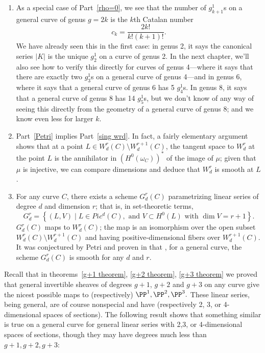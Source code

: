 \begin{remark}
\begin{enumerate}
\item As a special case of Part~\ref{rho=0}, we see that the number of $g^1_{k+1}$s on a general curve of genus $g = 2k$ is the $k$th Catalan number 
$$
c_k = \frac{2k!}{k!(k+1)!}.
$$
We have already seen this in the first case: in genus 2, it says the canonical series $|K|$ is the unique $g^1_2$ on a curve of genus 2. In the next chapter, we'll also see how to verify this directly for curves of genus 4---where it says that there are exactly two $g^1_3$s on a general curve of genus 4---and in genus 6, where it says that a general curve of genus 6 has 5 $g^1_4$s.  In genus 8, it says that a general curve of genus 8 has 14 $g^1_5$s, but we don't know of any way of seeing this directly from the geometry of a general curve of genus 8; and we know even less for larger $k$.

\item Part~\ref{Petri} implies Part~\ref{sing wrd}. In fact, a fairly elementary argument shows that at a point $L \in W^r_d(C) \setminus W^{r+1}_d(C)$, the tangent space to $W^r_d$ at the point $L$ is the annihilator
in $(H^0(\omega_C))^*$ of the image of $\mu$; given that $\mu$ is injective, we can compare dimensions and deduce that $W^r_d$ is smooth at $L$.

\item For any curve $C$, there exists a scheme $G^r_d(C)$ parametrizing linear series of degree $d$ and dimension $r$; that is, in set-theoretic terms,
$$
G^r_d = \left\{ (L, V) \mid L \in Pic^d(C), \text{ and } V \subset H^0(L) \text{ with } \dim V = r+1 \right\}.
$$
$G^r_d(C)$ maps to $W^r_d(C)$; the map is an isomorphism over the open subset $W^r_d(C) \setminus W^{r+1}_d(C)$ and having positive-dimensional fibers over $W^{r+1}_d(C)$. It was conjectured
by Petri and proven in \cite{Gieseker-Petri} that , for a general curve, the scheme $G^r_d(C)$ is smooth for any $d$ and $r$.
\end{enumerate}
\end{remark}


Recall that  in theorems~\ref{g+1 theorem}, \ref{g+2 theorem}, \ref{g+3 theorem} we proved that
general invertible sheaves of degrees $g+1$, $g+2$ and $g+3$ on any curve
give the nicest possible maps to (respectively) $\PP^1, \PP^2, \PP^3.$ These
linear series, being general, are of course nonspecial and have (respectively
2, 3, or 4-dimensional spaces of sections). The following result shows that something
similar is true on a general curve for general linear series with 2,3, or 4-dimensional
spaces of sections, though they may have degrees much less than $g+1, g+2, g+3$:

